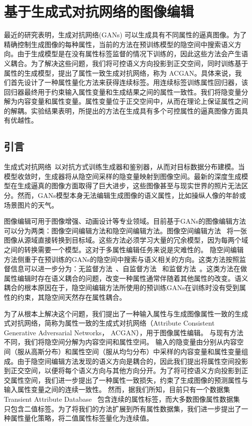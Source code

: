 \chapter{基于生成式对抗网络的图像编辑}

最近的研究表明，生成对抗网络(GANs) 可以生成具有不同属性的逼真图像。为了精确控制生成图像的每种属性，当前的方法在预训练模型的隐空间中搜索语义方向。由于生成模型是在没有属性标签监督的情况下训练的，因此这些方法会产生语义耦合。为了解决这些问题，我们将可控语义方向投影到正交空间，同时训练基于属性的生成模型，提出了属性一致生成对抗网络，称为 ACGAN。具体来说，我们首先设计了一种属性量化方法来获得连续标签。用连续标签训练属性回归器，该回归器最终用于约束输入属性变量和生成结果之间的属性一致性。我们将隐变量分解为内容变量和属性变量。属性变量位于正交空间中，从而在理论上保证属性之间的解耦。实验结果表明，所提出的方法在生成具有多个可控属性的逼真图像方面具有优越性。

\section{引言}

生成式对抗网络~\cite{GANs}以对抗方式训练生成器和鉴别器，从而对目标数据分布建模。当模型收敛时，生成器将从隐空间采样的隐变量映射到图像空间。最新的深度生成模型在生成逼真的图像方面取得了巨大进步，这些图像甚至与现实世界的照片无法区分。然而，GANs模型本身无法编辑生成图像的语义属性，比如操纵人像的年龄或场景图片的天气。

图像编辑可用于图像增强、动画设计等专业领域。目前基于GANs的图像编辑方法可以分为两类：图像空间编辑方法和隐空间编辑方法。图像空间编辑方法~\cite{cyclegan,i2i0,i2i1,i2i2} 将一张图像从源域直接转换到目标域。这些方法必须学习大量的冗余模型，因为每两个域之间的转换需要一个模型。这对于多属性编辑任务来说是灾难性的。
隐空间编辑方法侧重于在预训练的GANs的隐空间中搜索与语义相关的方向。这类方法按照监督信息可以进一步分为：无监督方法~\cite{icml2020,harkonen2020ganspace}、自监督方法~\cite{steer,variation} 和监督方法~\cite{interfacegan,iclr2021}。这类方法在做属性编辑时存在语义耦合的问题，改变一种属性通常伴随着其他属性的改变。语义耦合的根本原因在于，隐空间编辑方法所使用的预训练GANs在训练时没有受到属性的约束，其隐空间天然存在属性耦合。

为了从根本上解决这个问题，我们提出了一种输入属性与生成图像属性一致的生成式对抗网络，简称为属性一致的生成式对抗网络（Attribute Consistent Generative Adversarial Networks， ACGAN），用于图像属性编辑。
与现有方法不同，我们将隐空间分解为内容空间和属性空间。
输入的隐变量由分别从内容空间（服从高斯分布）和属性空间（服从均匀分布）中采样的内容变量和属性变量组成。由于隐空间编辑方法发现的语义方向是耦合的，因此我们提出将属性空间投影到正交空间，以便将每个语义方向与其他方向分开。为了将可控语义方向投影到正交属性空间，我们进一步提出了一种属性一致损失，约束了生成图像的预测属性与输入属性变量之间的连续一致性。
然而，据我们所知，目前只有一个数据集Transient Attribute Database~\cite{scenedataset} 包含连续的属性标签，而大多数图像属性数据集~\cite{celeba,place,sun} 只包含二值标签。为了将我们的方法扩展到所有属性数据集，我们进一步提出了一种属性量化策略，将二值属性标签量化为连续值。

